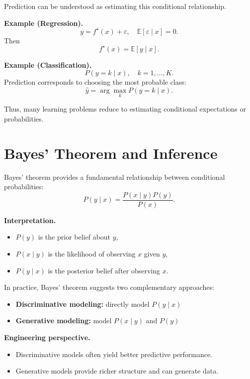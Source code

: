 \medskip

\noindent
Prediction can be understood as estimating this conditional relationship.

\medskip

\noindent
\textbf{Example (Regression).}
\[
y = f^\star(x) + \varepsilon, \quad \mathbb{E}[\varepsilon \mid x] = 0.
\]
Then
\[
f^\star(x) = \mathbb{E}[y \mid x].
\]

\medskip

\noindent
\textbf{Example (Classification).}
\[
P(y = k \mid x), \quad k = 1, \dots, K.
\]
Prediction corresponds to choosing the most probable class:
\[
\hat{y} = \arg\max_k P(y = k \mid x).
\]

\medskip

Thus, many learning problems reduce to estimating conditional expectations or probabilities.

\section{Bayes' Theorem and Inference}

Bayes' theorem provides a fundamental relationship between conditional probabilities:
\[
P(y \mid x) = \frac{P(x \mid y) P(y)}{P(x)}.
\]

\medskip

\noindent
\textbf{Interpretation.}
\begin{itemize}
    \item $P(y)$ is the prior belief about $y$,
    \item $P(x \mid y)$ is the likelihood of observing $x$ given $y$,
    \item $P(y \mid x)$ is the posterior belief after observing $x$.
\end{itemize}

\medskip

In practice, Bayes' theorem suggests two complementary approaches:
\begin{itemize}
    \item \textbf{Discriminative modeling:} directly model $P(y \mid x)$
    \item \textbf{Generative modeling:} model $P(x \mid y)$ and $P(y)$
\end{itemize}

\medskip

\noindent
\textbf{Engineering perspective.}
\begin{itemize}
    \item Discriminative models often yield better predictive performance.
    \item Generative models provide richer structure and can generate data.
\end{itemize}

